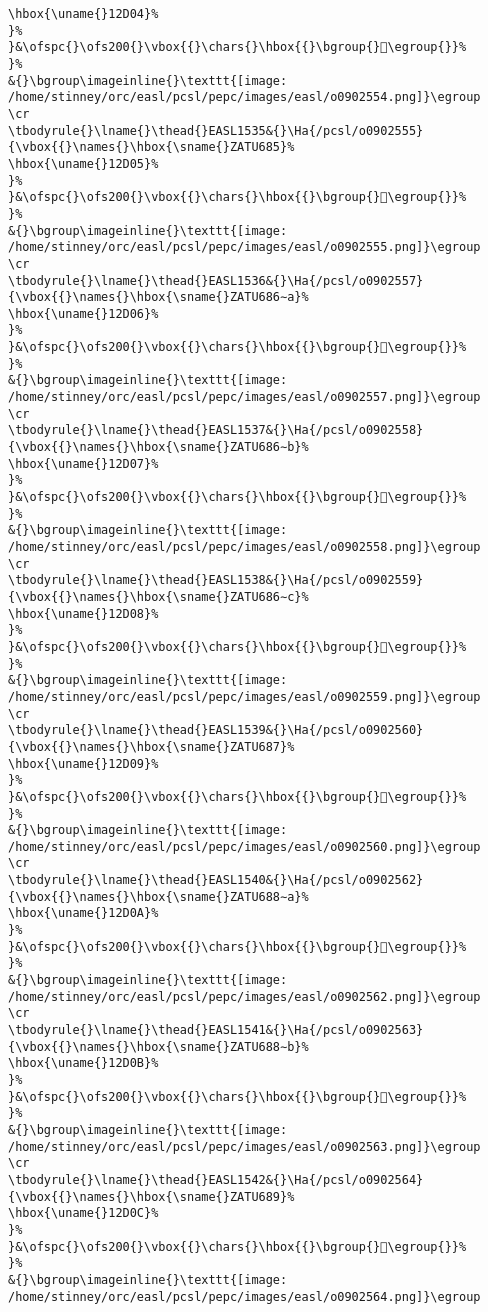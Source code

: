 \begin{verbatim}
\hbox{\uname{}12D04}%
}%
}&\ofspc{}\ofs200{}\vbox{{}\chars{}\hbox{{}\bgroup{}𒴄\egroup{}}%
}%
&{}\bgroup\imageinline{}\texttt{[image: /home/stinney/orc/easl/pcsl/pepc/images/easl/o0902554.png]}\egroup
\cr
\tbodyrule{}\lname{}\thead{}EASL1535&{}\Ha{/pcsl/o0902555}{\vbox{{}\names{}\hbox{\sname{}ZATU685}%
\hbox{\uname{}12D05}%
}%
}&\ofspc{}\ofs200{}\vbox{{}\chars{}\hbox{{}\bgroup{}𒴅\egroup{}}%
}%
&{}\bgroup\imageinline{}\texttt{[image: /home/stinney/orc/easl/pcsl/pepc/images/easl/o0902555.png]}\egroup
\cr
\tbodyrule{}\lname{}\thead{}EASL1536&{}\Ha{/pcsl/o0902557}{\vbox{{}\names{}\hbox{\sname{}ZATU686∼a}%
\hbox{\uname{}12D06}%
}%
}&\ofspc{}\ofs200{}\vbox{{}\chars{}\hbox{{}\bgroup{}𒴆\egroup{}}%
}%
&{}\bgroup\imageinline{}\texttt{[image: /home/stinney/orc/easl/pcsl/pepc/images/easl/o0902557.png]}\egroup
\cr
\tbodyrule{}\lname{}\thead{}EASL1537&{}\Ha{/pcsl/o0902558}{\vbox{{}\names{}\hbox{\sname{}ZATU686∼b}%
\hbox{\uname{}12D07}%
}%
}&\ofspc{}\ofs200{}\vbox{{}\chars{}\hbox{{}\bgroup{}𒴇\egroup{}}%
}%
&{}\bgroup\imageinline{}\texttt{[image: /home/stinney/orc/easl/pcsl/pepc/images/easl/o0902558.png]}\egroup
\cr
\tbodyrule{}\lname{}\thead{}EASL1538&{}\Ha{/pcsl/o0902559}{\vbox{{}\names{}\hbox{\sname{}ZATU686∼c}%
\hbox{\uname{}12D08}%
}%
}&\ofspc{}\ofs200{}\vbox{{}\chars{}\hbox{{}\bgroup{}𒴈\egroup{}}%
}%
&{}\bgroup\imageinline{}\texttt{[image: /home/stinney/orc/easl/pcsl/pepc/images/easl/o0902559.png]}\egroup
\cr
\tbodyrule{}\lname{}\thead{}EASL1539&{}\Ha{/pcsl/o0902560}{\vbox{{}\names{}\hbox{\sname{}ZATU687}%
\hbox{\uname{}12D09}%
}%
}&\ofspc{}\ofs200{}\vbox{{}\chars{}\hbox{{}\bgroup{}𒴉\egroup{}}%
}%
&{}\bgroup\imageinline{}\texttt{[image: /home/stinney/orc/easl/pcsl/pepc/images/easl/o0902560.png]}\egroup
\cr
\tbodyrule{}\lname{}\thead{}EASL1540&{}\Ha{/pcsl/o0902562}{\vbox{{}\names{}\hbox{\sname{}ZATU688∼a}%
\hbox{\uname{}12D0A}%
}%
}&\ofspc{}\ofs200{}\vbox{{}\chars{}\hbox{{}\bgroup{}𒴊\egroup{}}%
}%
&{}\bgroup\imageinline{}\texttt{[image: /home/stinney/orc/easl/pcsl/pepc/images/easl/o0902562.png]}\egroup
\cr
\tbodyrule{}\lname{}\thead{}EASL1541&{}\Ha{/pcsl/o0902563}{\vbox{{}\names{}\hbox{\sname{}ZATU688∼b}%
\hbox{\uname{}12D0B}%
}%
}&\ofspc{}\ofs200{}\vbox{{}\chars{}\hbox{{}\bgroup{}𒴋\egroup{}}%
}%
&{}\bgroup\imageinline{}\texttt{[image: /home/stinney/orc/easl/pcsl/pepc/images/easl/o0902563.png]}\egroup
\cr
\tbodyrule{}\lname{}\thead{}EASL1542&{}\Ha{/pcsl/o0902564}{\vbox{{}\names{}\hbox{\sname{}ZATU689}%
\hbox{\uname{}12D0C}%
}%
}&\ofspc{}\ofs200{}\vbox{{}\chars{}\hbox{{}\bgroup{}𒴌\egroup{}}%
}%
&{}\bgroup\imageinline{}\texttt{[image: /home/stinney/orc/easl/pcsl/pepc/images/easl/o0902564.png]}\egroup

\end{verbatim}
